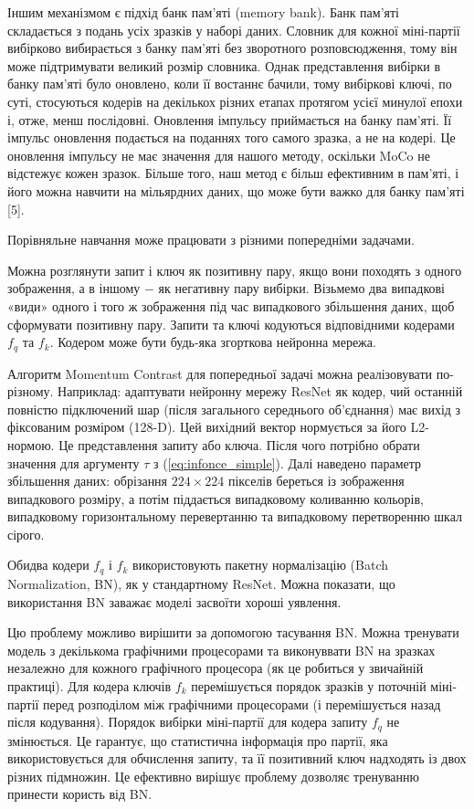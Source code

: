 Іншим механізмом є підхід банк пам'яті (memory bank). Банк пам'яті складається з подань усіх зразків у наборі даних. Словник для кожної міні-партії вибірково вибирається з банку пам'яті без зворотного розповсюдження, тому він може підтримувати великий розмір словника. Однак представлення вибірки в банку пам'яті було оновлено, коли її востаннє бачили, тому вибіркові ключі, по суті, стосуються кодерів на декількох різних етапах протягом усієї минулої епохи і, отже, менш послідовні. Оновлення імпульсу приймається на банку пам'яті. Її імпульс оновлення подається на поданнях того самого зразка, а не на кодері. Це оновлення імпульсу не має значення для нашого методу, оскільки MoCo не відстежує кожен зразок. Більше того, наш метод є більш ефективним в пам’яті, і його можна навчити на мільярдних даних, що може бути важко для банку пам'яті [5].

Порівняльне навчання може працювати з різними попередніми задачами.

Можна розглянути запит і ключ як позитивну пару, якщо вони походять з одного зображення, а в іншому $-$ як негативну пару вибірки. Візьмемо два випадкові «види» одного і того ж зображення під час випадкового збільшення даних, щоб сформувати позитивну пару. Запити та ключі кодуються відповідними кодерами $f_{q}$ та $f_{k}$. Кодером може бути будь-яка згорткова нейронна мережа.

Алгоритм Momentum Contrast для попередньої задачі можна реалізовувати по-різному. Наприклад: адаптувати нейронну мережу ResNet як кодер, чий останній повністю підключений шар (після загального середнього об'єднання) має вихід з фіксованим розміром (128-D). Цей вихідний вектор нормується за його L2-нормою. Це представлення запиту або ключа. Після чого потрібно обрати значення для аргументу $\tau$ з (\ref{eq:infonce_simple}). Далі наведено параметр збільшення даних: обрізання $224 \times 224$ пікселів береться із зображення випадкового розміру, а потім піддається випадковому коливанню кольорів, випадковому горизонтальному перевертанню та випадковому перетворенню шкал сірого.

Обидва кодери $f_{q}$ і $f_{k}$ використовують пакетну нормалізацію (Batch Normalization, BN), як у стандартному ResNet. Можна показати, що використання BN заважає моделі засвоїти хороші уявлення.

Цю проблему можливо вирішити за допомогою тасування BN. Можна тренувати модель з декількома графічними процесорами та виконуввати BN на зразках незалежно для кожного графічного процесора (як це робиться у звичайній практиці). Для кодера ключів $f_{k}$ перемішується порядок зразків у поточній міні-партії перед розподілом між графічними процесорами (і перемішується назад після кодування). Порядок вибірки міні-партії для кодера запиту $f_{q}$ не змінюється. Це гарантує, що статистична інформація про партії, яка використовується для обчислення запиту, та її позитивний ключ надходять із двох різних підмножин. Це ефективно вирішує проблему дозволяє тренуванню принести користь від BN.

